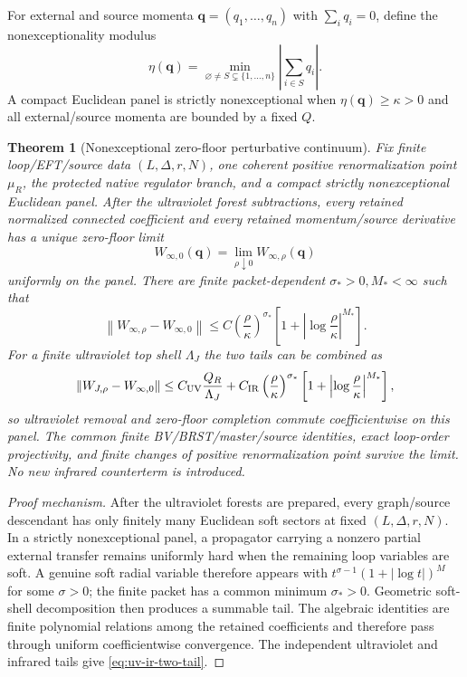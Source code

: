 \documentclass[11pt,a4paper,oneside]{book}
\theoremstyle{plain}
\newtheorem{theorem}{Theorem}[chapter]
\theoremstyle{definition}
\theoremstyle{remark}
\newcommand{\norm}[1]{\left\lVert#1\right\rVert}
\begin{document}
For external and source momenta $\mathbf q=(q_1,\ldots,q_n)$ with
$\sum_iq_i=0$, define the nonexceptionality modulus
\begin{equation}
 \eta(\mathbf q)=
 \min_{\varnothing\ne S\subsetneq\{1,\ldots,n\}}
 \left|\sum_{i\in S}q_i\right|.
 \label{eq:nonexceptionality-modulus}
\end{equation}
A compact Euclidean panel is strictly nonexceptional when
$\eta(\mathbf q)\ge\kappa>0$ and all external/source momenta are bounded by a
fixed $Q$.

\begin{theorem}[Nonexceptional zero-floor perturbative continuum]
\label{thm:nonexceptional-zero-floor}
Fix finite loop/EFT/source data $(L,\Delta,r,N)$, one coherent positive
renormalization point $\mu_R$, the protected native regulator branch, and a
compact strictly nonexceptional Euclidean panel.  After the ultraviolet forest
subtractions, every retained normalized connected coefficient and every
retained momentum/source derivative has a unique zero-floor limit
\begin{equation}
 W_{\infty,0}(\mathbf q)
 =\lim_{\rho\downarrow0}W_{\infty,\rho}(\mathbf q)
 \label{eq:zero-floor-limit}
\end{equation}
uniformly on the panel.  There are finite packet-dependent
$\sigma_*>0,M_*<\infty$ such that
\begin{equation}
 \norm{W_{\infty,\rho}-W_{\infty,0}}
 \le C\left(\frac{\rho}{\kappa}\right)^{\sigma_*}
 \left[1+\left|\log\frac{\rho}{\kappa}\right|^{M_*}\right].
 \label{eq:zero-floor-rate}
\end{equation}
For a finite ultraviolet top shell $\Lambda_J$ the two tails can be combined as
\begin{equation}
 \norm{W_{J,\rho}-W_{\infty,0}}
 \le C_{\rm UV}\frac{Q_R}{\Lambda_J}
 +C_{\rm IR}\left(\frac{\rho}{\kappa}\right)^{\sigma_*}
 \left[1+\left|\log\frac{\rho}{\kappa}\right|^{M_*}\right],
 \label{eq:uv-ir-two-tail}
\end{equation}
so ultraviolet removal and zero-floor completion commute coefficientwise on
this panel.  The common finite BV/BRST/master/source identities, exact
loop-order projectivity, and finite changes of positive renormalization point
survive the limit.  No new infrared counterterm is introduced.
\end{theorem}
\begin{proof}[Proof mechanism]
After the ultraviolet forests are prepared, every graph/source descendant has
only finitely many Euclidean soft sectors at fixed $(L,\Delta,r,N)$.  In a
strictly nonexceptional panel, a propagator carrying a nonzero partial external
transfer remains uniformly hard when the remaining loop variables are soft.
A genuine soft radial variable therefore appears with
$t^{\sigma-1}(1+|\log t|)^M$ for some $\sigma>0$; the finite packet has a common
minimum $\sigma_*>0$.  Geometric soft-shell decomposition then produces a
summable tail.  The algebraic identities are finite polynomial relations among
the retained coefficients and therefore pass through uniform coefficientwise
convergence.  The independent ultraviolet and infrared tails give
\eqref{eq:uv-ir-two-tail}.
\end{proof}
\end{document}
